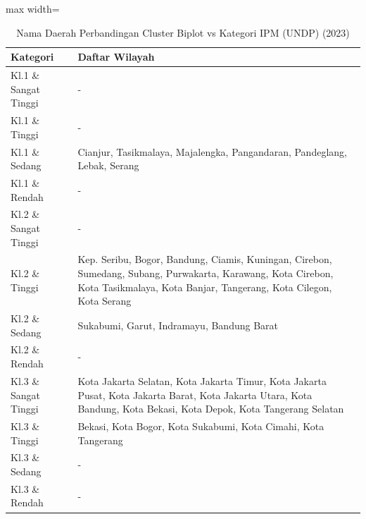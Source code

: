 \begin{table}[H]
\centering
\caption{Nama Daerah Perbandingan Cluster Biplot vs Kategori IPM (UNDP) (2023)} \label{tab:crossname2023}
\begin{adjustbox}{max width=\textwidth}
\begin{tabular}{|p{4cm}|p{10cm}|}
\hline
\textbf{Kategori} & \textbf{Daftar Wilayah} \\
\hline
Kl.1 \& Sangat Tinggi & - \\
\hline
Kl.1 \& Tinggi & - \\
\hline
Kl.1 \& Sedang & Cianjur, Tasikmalaya, Majalengka, Pangandaran, Pandeglang, Lebak, Serang \\
\hline
Kl.1 \& Rendah & - \\
\hline
Kl.2 \& Sangat Tinggi & - \\
\hline
Kl.2 \& Tinggi & Kep. Seribu, Bogor, Bandung, Ciamis, Kuningan, Cirebon, Sumedang, Subang, Purwakarta, Karawang, Kota Cirebon, Kota Tasikmalaya, Kota Banjar, Tangerang, Kota Cilegon, Kota Serang \\
\hline
Kl.2 \& Sedang & Sukabumi, Garut, Indramayu, Bandung Barat \\
\hline
Kl.2 \& Rendah & - \\
\hline
Kl.3 \& Sangat Tinggi & Kota Jakarta Selatan, Kota Jakarta Timur, Kota Jakarta Pusat, Kota Jakarta Barat, Kota Jakarta Utara, Kota Bandung, Kota Bekasi, Kota Depok, Kota Tangerang Selatan \\
\hline
Kl.3 \& Tinggi & Bekasi, Kota Bogor, Kota Sukabumi, Kota Cimahi, Kota Tangerang \\
\hline
Kl.3 \& Sedang & - \\
\hline
Kl.3 \& Rendah & - \\
\hline
\end{tabular}
\end{adjustbox}
\end{table}